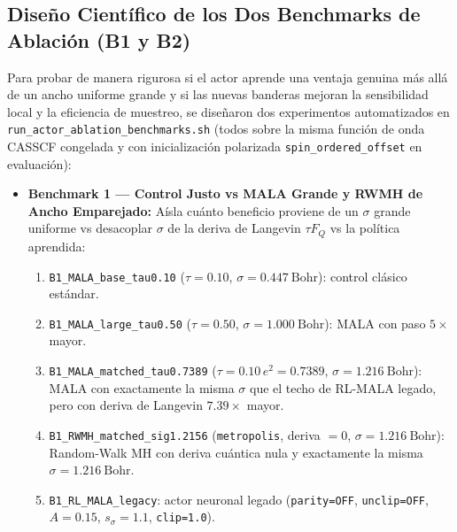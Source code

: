 \documentclass[10pt,a4paper]{article}
\begin{document}
\subsection{Diseño Científico de los Dos Benchmarks de Ablación (B1 y B2)}

Para probar de manera rigurosa si el actor aprende una ventaja genuina más allá de un ancho uniforme grande y si las nuevas banderas mejoran la sensibilidad local y la eficiencia de muestreo, se diseñaron dos experimentos automatizados en \texttt{run\_actor\_ablation\_benchmarks.sh} (todos sobre la misma función de onda CASSCF congelada y con inicialización polarizada \texttt{spin\_ordered\_offset} en evaluación):

\begin{itemize}
\item \textbf{Benchmark 1 — Control Justo vs MALA Grande y RWMH de Ancho Emparejado:} Aísla cuánto beneficio proviene de un $\sigma$ grande uniforme vs desacoplar $\sigma$ de la deriva de Langevin $\tau F_Q$ vs la política aprendida:
  \begin{enumerate}
  \item \texttt{B1\_MALA\_base\_tau0.10} ($\tau=0.10$, $\sigma=0.447\ \mathrm{Bohr}$): control clásico estándar.
  \item \texttt{B1\_MALA\_large\_tau0.50} ($\tau=0.50$, $\sigma=1.000\ \mathrm{Bohr}$): MALA con paso $5\times$ mayor.
  \item \texttt{B1\_MALA\_matched\_tau0.7389} ($\tau=0.10\,e^2=0.7389$, $\sigma=1.216\ \mathrm{Bohr}$): MALA con exactamente la misma $\sigma$ que el techo de RL-MALA legado, pero con deriva de Langevin $7.39\times$ mayor.
  \item \texttt{B1\_RWMH\_matched\_sig1.2156} (\texttt{metropolis}, deriva $=0$, $\sigma=1.216\ \mathrm{Bohr}$): Random-Walk MH con deriva cuántica nula y exactamente la misma $\sigma=1.216\ \mathrm{Bohr}$.
  \item \texttt{B1\_RL\_MALA\_legacy}: actor neuronal legado (\texttt{parity=OFF}, \texttt{unclip=OFF}, $A=0.15$, $s_\sigma=1.1$, \texttt{clip=1.0}).
  \end{enumerate}


\end{itemize}
\end{document}
